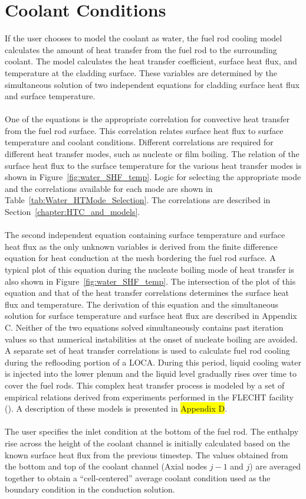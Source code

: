\section{Coolant Conditions}\label{section:coolant-conditions}

If the user chooses to model the coolant as water, the fuel rod cooling model calculates the amount
of heat transfer from the fuel rod to the surrounding coolant. The model calculates the heat
transfer coefficient, surface heat flux, and temperature at the cladding surface. These variables
are determined by the simultaneous solution of two independent equations for cladding surface heat
flux and surface temperature.
\\
\\
One of the equations is the appropriate correlation for convective heat transfer from the fuel rod
surface. This correlation relates surface heat flux to surface temperature and coolant conditions.
Different correlations are required for different heat transfer modes, such as nucleate or film
boiling. The relation of the surface heat flux to the surface temperature for the various heat
transfer modes is shown in Figure~\ref{fig:water_SHF_temp}. Logic for selecting the appropriate mode
and the correlations available for each mode are shown in Table~\ref{tab:Water_HTMode_Selection}.
The correlations are described in Section~\ref{chapter:HTC_and_models}.
\\
\\
The second independent equation containing surface temperature and surface heat flux as the only
unknown variables is derived from the finite difference equation for heat conduction at the mesh
bordering the fuel rod surface. A typical plot of this equation during the nucleate boiling mode of
heat transfer is also shown in Figure~\ref{fig:water_SHF_temp}. The intersection of the plot of this
equation and that of the heat transfer correlations determines the surface heat flux and
temperature. The derivation of this equation and the simultaneous solution for surface temperature
and surface heat flux are described in Appendix C. Neither of the two equations solved
simultaneously contains past iteration values so that numerical instabilities at the onset of
nucleate boiling are avoided. A separate set of heat transfer correlations is used to calculate fuel
rod cooling during the reflooding portion of a LOCA.  During this period, liquid cooling water is
injected into the lower plenum and the liquid level gradually rises over time to cover the fuel
rods. This complex heat transfer process is modeled by a set of empirical relations derived from
experiments performed in the FLECHT facility (\cite{ref:Cadek1972}). A description
of these models is presented in \colorbox{yellow}{Appendix D}.
\\
\\
The user specifies the inlet condition at the bottom of the fuel rod.  The enthalpy rise across the
height of the coolant channel is initially calculated based on the known surface heat flux from the
previous timestep. The values obtained from the bottom and top of the coolant channel (Axial nodes
$j-1$ and $j$) are averaged together to obtain a ``cell-centered'' average coolant condition used as
the boundary condition in the conduction solution.

